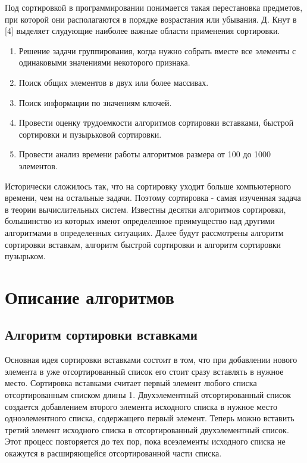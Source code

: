 \documentclass[a4paper,14pt]{report}
\begin{document}
Под сортировкой в программировании понимается такая перестановка предметов, при которой они располагаются в порядке возрастания или убывания. Д. Кнут в [4] выделяет слудующие наиболее важные области применения сортировки.
\begin{enumerate}
	\item Решение задачи группирования, когда нужно собрать вместе все элементы с одинаковыми значениями некоторого признака.
	\item Поиск общих элементов в двух или более массивах.
	\item Поиск информации по значениям ключей.
	\item Провести оценку трудоемкости алгоритмов сортировки вставками, быстрой сортировки и пузырьковой сортировки.
	\item Провести анализ времени работы алгоритмов размера от 100 до 1000 элементов.
\end{enumerate}

Исторически сложилось так, что на сортировку уходит больше компьютерного времени, чем на остальные задачи. Поэтому сортировка - самая изученная задача в теории вычислительных систем.
Известны десятки алгоритмов сортировки, большинство из которых имеют определенное преимущество над другими алгоритмами в определенных ситуациях.
Далее будут рассмотрены алгоритм сортировки вставкам, алгоритм быстрой сортировки и алгоритм сортировки пузырьком.

\section*{Описание алгоритмов}

\subsection*{Алгоритм сортировки вставками}

Основная идея сортировки вставками состоит в том, что при добавлении нового элемента в уже отсортированный список его стоит сразу вставлять в нужное место.
Сортировка вставками считает первый элемент любого списка отсортированным списком длины 1.
Двухэлементный отсортированный список создается добавлением второго элемента исходного списка в нужное место одноэлементного списка, содержащего первый элемент.
Теперь можно вставить третий элемент исходного списка в отсортированный двухэлементный список. Этот процесс повторяется до тех пор, пока всеэлементы исходного списка не окажутся в расширяющейся отсортированной части списка.
\end{document}
